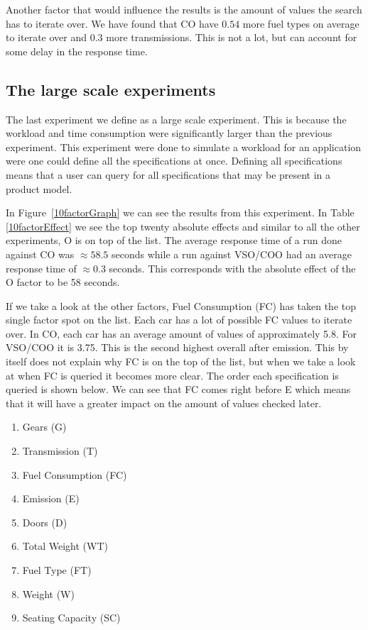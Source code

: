 \documentclass{llncs}
\begin{document}
Another factor that would influence the results is the amount of
values the search has to iterate over.  We have found that CO have
$0.54$ more fuel types on average to iterate over and $0.3$ more
transmissions. This is not a lot, but can account for some delay in
the response time.

\subsection{The large scale experiments}
The last experiment we define as a large scale experiment. This is
because the workload and time consumption were significantly larger
than the previous experiment. This experiment were done
to simulate a workload for an application were one could define all
the specifications at once. Defining all specifications means that a
user can query for all specifications that may be present in a product
model.

In Figure~\ref{10factorGraph} we can see the results from this
experiment. In Table
\ref{10factorEffect} we see the top twenty absolute effects and
similar to all the other experiments, O is on top of the list. The
average response time of a run done against CO was $\approx58.5$
seconds while a run against VSO/COO had an average response time of
$\approx0.3$ seconds.  This corresponds with the absolute effect of
the O factor to be 58 seconds.
 
If we take a look at the other factors, Fuel Consumption (FC) has
taken the top single factor spot on the list.  Each car has a lot of 
possible FC values to iterate
over. In CO, each car has an average amount of values of approximately
5.8. For VSO/COO it is 3.75.  This is the second highest overall after
emission. This by itself does not explain why FC is on the top of the
list, but when we take a look at when FC is queried it becomes more
clear. The order each specification is queried is shown below.  We can
see that FC comes right before E which means that it will have a
greater impact on the amount of values checked later.

 \begin{enumerate}
		\item Gears (G)
		\item Transmission (T)
		\item Fuel Consumption (FC)
		\item Emission (E)
		\item Doors (D)
		\item Total Weight (WT)
		\item Fuel Type (FT)
		\item Weight (W)
		\item Seating Capacity (SC)
\end{enumerate}
\end{document}
